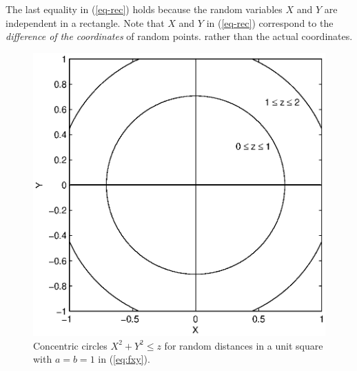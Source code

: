 \documentclass[12pt,draftclsnofoot,onecolumn]{IEEEtran}
\begin{document}
The last equality in (\ref{eq-rec}) holds because the random variables
$X$ and $Y$ are independent in a rectangle.
Note that $X$ and $Y$ in (\ref{eq-rec}) correspond to the \textit{difference of the coordinates} of random points.
rather than the actual coordinates.
%

\begin{figure}
  \centering
  \includegraphics[width=0.5\columnwidth]{fig/square_within}
  \caption{Concentric circles $X^2+Y^2 \leq z$ for random distances in a unit square
  with $a=b=1$ in (\ref{eq:fxy}).}
  \label{fig:square}
\end{figure}
\end{document}
